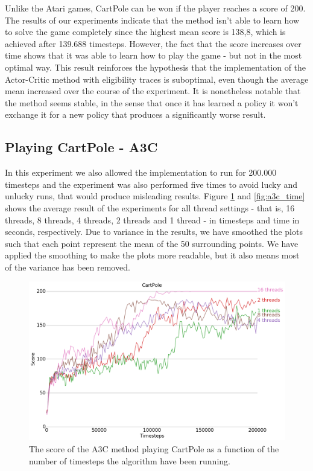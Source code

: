\documentclass[11pt]{article}
\begin{document}
Unlike the Atari games, CartPole can be won if the player reaches a score of 200.
The results of our experiments indicate that
the method isn't able to learn how to solve the game completely
since the highest mean score is 138,8, which is achieved after 139.688 timesteps.
However, the fact that the score increases over time
shows that it was able to learn how to play the game -
but not in the most optimal way.
This result reinforces the hypothesis that the implementation of the
Actor-Critic method with eligibility traces is suboptimal, even
though the average mean increased over the course of the experiment.
It is nonetheless notable that the method seems stable, in the sense that once it has learned
a policy it won't exchange it for a new policy that produces a significantly worse result.


\subsection{Playing CartPole - A3C}

In this experiment we also allowed the implementation to run for
200.000 timesteps and
the experiment was also performed five times to avoid lucky and unlucky runs,
that would produce misleading results.
Figure \ref{fig:a3c_time_steps} and \ref{fig:a3c_time} shows the average
result of the experiments for all thread settings - that is, 16 threads, 8 threads, 4 threads,
2 threads and 1 thread - in timesteps and time in seconds, respectively.
Due to variance in the results, 
we have smoothed the plots such that each point represent the mean of the 50
surrounding points.
We have applied the smoothing to make the plots more readable,
but it also means most of the variance has been removed.

\begin{figure}[H]
    \centering
    \includegraphics[scale=0.4]{plots/cartpole_compare_counter_without_AC.png}
    \caption{The score of the A3C method playing CartPole as a function
    of the number of timesteps the algorithm have been running.}
    \label{fig:a3c_time_steps}
\end{figure}
\end{document}
